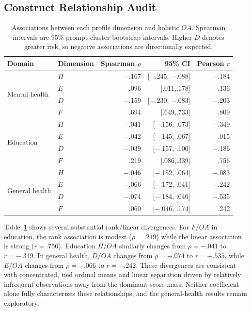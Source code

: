 \documentclass[manuscript,review,anonymous]{acmart}
\begin{document}
\subsection{Construct Relationship Audit}

\begin{table}[t]
\centering
\small
\caption{Associations between each profile dimension and holistic $OA$. Spearman intervals are 95\% prompt-cluster bootstrap intervals. Higher $D$ denotes greater risk, so negative associations are directionally expected.}
\label{tab:construct-relationships}
\begin{tabular}{llrrr}
\toprule
Domain & Dimension & Spearman $\rho$ & 95\% CI & Pearson $r$\\
\midrule
\multirow{4}{*}{Mental health}
 & $H$ & $-$.167 & [$-$.245, $-$.088] & $-$.184\\
 & $E$ & .096 & [.011,.178] & .136\\
 & $D$ & $-$.159 & [$-$.230, $-$.083] & $-$.203\\
 & $F$ & .694 & [.649,.733] & .809\\
\midrule
\multirow{4}{*}{Education}
 & $H$ & $-$.041 & [$-$.156, .073] & $-$.349\\
 & $E$ & $-$.042 & [$-$.145, .067] & .015\\
 & $D$ & $-$.039 & [$-$.157, .100] & $-$.186\\
 & $F$ & .219 & [.086,.339] & .756\\
\midrule
\multirow{4}{*}{General health}
 & $H$ & $-$.046 & [$-$.152, .064] & $-$.083\\
 & $E$ & $-$.066 & [$-$.172, .041] & $-$.242\\
 & $D$ & $-$.074 & [$-$.184, .040] & $-$.535\\
 & $F$ & .060 & [$-$.046, .174] & .242\\
\bottomrule
\end{tabular}
\end{table}

Table~\ref{tab:construct-relationships} shows several substantial rank/linear divergences. For $F/OA$ in education, the rank association is modest ($\rho=.219$) while the linear association is strong ($r=.756$). Education $H/OA$ similarly changes from $\rho=-.041$ to $r=-.349$. In general health, $D/OA$ changes from $\rho=-.074$ to $r=-.535$, while $E/OA$ changes from $\rho=-.066$ to $r=-.242$. These divergences are consistent with concentrated, tied ordinal means and linear separation driven by relatively infrequent observations away from the dominant score mass. Neither coefficient alone fully characterizes these relationships, and the general-health results remain exploratory.
\end{document}
